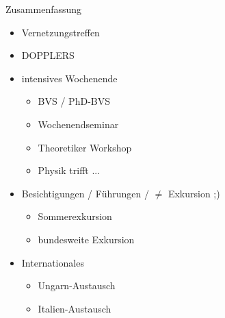 \documentclass[
]{beamer}
\begin{document}
\begin{frame}{Zusammenfassung}
  \begin{itemize}
    \item Vernetzungstreffen
    \item DOPPLERS
    \item intensives Wochenende
    \begin{itemize}
      \item BVS / PhD-BVS
      \item Wochenendseminar
      \item Theoretiker Workshop
      \item Physik trifft ...
    \end{itemize}
    \item Besichtigungen / Führungen / $\neq$ Exkursion ;)
    \begin{itemize}
      \item Sommerexkursion
      \item bundesweite Exkursion
    \end{itemize}
    \item Internationales
    \begin{itemize}
      \item Ungarn-Austausch
      \item Italien-Austausch
    \end{itemize}
  \end{itemize}
\end{frame}
\end{document}
